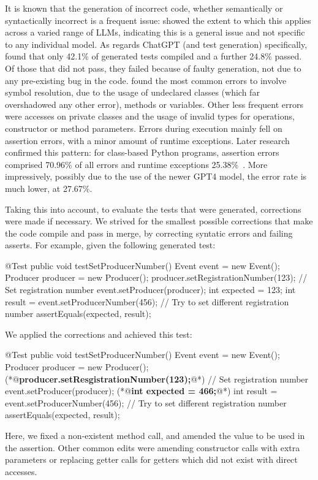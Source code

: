 It is known that the generation of incorrect code, whether semantically or syntactically incorrect is a frequent issue:  showed the extent to which this applies across a varied range of LLMs,
indicating this is a general issue and not specific to any individual model. As regards ChatGPT (and test generation) specifically,  found that only 42.1\% of generated tests compiled and a further
24.8\% passed. Of those that did not pass, they failed because of faulty generation, not due to any pre-existing bug in the code.
 found the most common errors to involve symbol resolution, due to the usage of undeclared classes (which far overshadowed any other error), methods or variables. Other less frequent errors were accesses on private classes and the usage
of invalid types for operations, constructor or method parameters.
Errors during execution mainly fell on assertion errors, with a minor amount of runtime exceptions.
Later research confirmed this pattern: for class-based Python programs, assertion errors comprised 70.96\% of all errors and runtime exceptions 25.38\%~\cite{kn:gpt4}. More impressively, possibly due to the use of the newer GPT4 model,
the error rate is much lower, at 27.67\%.

Taking this into account, to evaluate the tests that were generated, corrections were made if necessary. We strived for the smallest possible corrections that make the code compile and pass in merge, by correcting syntatic errors and failing asserts.
For example, given the following generated test:
\begin{response}
@Test
public void testSetProducerNumber() {
    Event event = new Event();
    Producer producer = new Producer();
    producer.setRegistrationNumber(123); // Set registration number
    event.setProducer(producer);
    int expected = 123;
    int result = event.setProducerNumber(456); // Try to set different registration number
    assertEquals(expected, result);
}
\end{response}
We applied the corrections and achieved this test:
\begin{response}
@Test
public void testSetProducerNumber() {
    Event event = new Event();
    Producer producer = new Producer();
    (*@\textbf{producer.setResgistrationNumber(123);}@*) // Set registration number
    event.setProducer(producer);
    (*@\textbf{int expected = 466;}@*)
    int result = event.setProducerNumber(456); // Try to set different registration number
    assertEquals(expected, result);
}
\end{response}
Here, we fixed a non-existent method call, and amended the value to be used in the assertion.
Other common edits were amending constructor calls with extra parameters or replacing getter calls for getters which did not exist with direct accesses.

